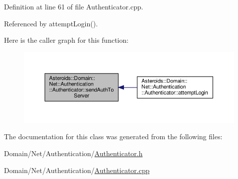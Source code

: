 Definition at line 61 of file Authenticator.\+cpp.



Referenced by attempt\+Login().

Here is the caller graph for this function\+:\nopagebreak
\begin{figure}[H]
\begin{center}
\leavevmode
\includegraphics[width=350pt]{classAsteroids_1_1Domain_1_1Net_1_1Authentication_1_1Authenticator_a8a8edfa95f03ea7dc5ca921f1e1ca622_icgraph}
\end{center}
\end{figure}


The documentation for this class was generated from the following files\+:\begin{DoxyCompactItemize}
\item 
Domain/\+Net/\+Authentication/\hyperlink{Authenticator_8h}{Authenticator.\+h}\item 
Domain/\+Net/\+Authentication/\hyperlink{Authenticator_8cpp}{Authenticator.\+cpp}\end{DoxyCompactItemize}

